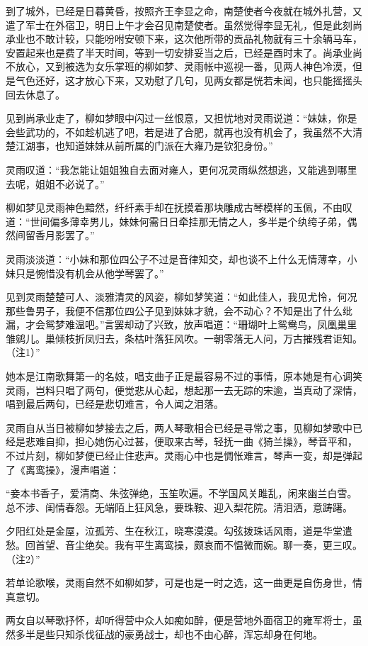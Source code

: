 到了城外，已经是日暮黄昏，按照齐王李显之命，南楚使者今夜就在城外扎营，又遣了军士在外宿卫，明日上午才会召见南楚使者。虽然觉得李显无礼，但是此刻尚承业也不敢计较，只能吩咐安顿下来，这次他所带的贡品礼物就有三十余辆马车，安置起来也是费了半天时间，等到一切安排妥当之后，已经是酉时末了。尚承业尚不放心，又到被选为女乐掌班的柳如梦、灵雨帐中巡视一番，见两人神色冷漠，但是气色还好，这才放心下来，又劝慰了几句，见两女都是恍若未闻，也只能摇摇头回去休息了。

见到尚承业走了，柳如梦眼中闪过一丝恨意，又担忧地对灵雨说道：“妹妹，你是会些武功的，不如趁机逃了吧，若是进了合肥，就再也没有机会了，我虽然不大清楚江湖事，也知道妹妹从前所属的门派在大雍乃是钦犯身份。”

灵雨叹道：“我怎能让姐姐独自去面对雍人，更何况灵雨纵然想逃，又能逃到哪里去呢，姐姐不必说了。”

柳如梦见灵雨神色黯然，纤纤素手却在抚摸着那块雕成古琴模样的玉佩，不由叹道：“世间偏多薄幸男儿，妹妹何需日日牵挂那无情之人，多半是个纨绔子弟，偶然间留香月影罢了。”

灵雨淡淡道：“小妹和那位四公子不过是音律知交，却也谈不上什么无情薄幸，小妹只是惋惜没有机会从他学琴罢了。”

见到灵雨楚楚可人、淡雅清灵的风姿，柳如梦笑道：“如此佳人，我见尤怜，何况那些鲁男子，我便不信那位四公子见到妹妹才貌，会不动心？不知是出了什么纰漏，才会鸳梦难温吧。”言罢却动了兴致，放声唱道：“珊瑚叶上鸳鸯鸟，凤凰巢里雏鹓儿。巢倾枝折凤归去，条枯叶落狂风吹。一朝零落无人问，万古摧残君讵知。（注1）”

她本是江南歌舞第一的名妓，唱支曲子正是最容易不过的事情，原本她是有心调笑灵雨，岂料只唱了两句，便觉悲从心起，想起那一去无踪的宋逾，当真动了深情，唱到最后两句，已经是悲切难言，令人闻之泪落。

灵雨自从当日被柳如梦接去之后，两人琴歌相合已经是寻常之事，见柳如梦歌中已经是悲难自抑，担心她伤心过甚，便取来古琴，轻抚一曲《猗兰操》，琴音平和，不过片刻，柳如梦便已经止住悲声。灵雨心中也是惆怅难言，琴声一变，却是弹起了《离鸾操》，漫声唱道：

“妾本书香子，爱清商、朱弦弹绝，玉笙吹遍。不学国风关雎乱，闲来幽兰白雪。总不涉、闺情春怨。无端陌上狂风急，要珠鞍、迎入梨花院。清泪洒，意踌躇。

夕阳红处是金屋，泣孤芳、生在秋江，晓寒漠漠。勾弦拨珠话风雨，道是华堂遣愁。回首望、音尘绝矣。我有平生离鸾操，颇哀而不愠微而婉。聊一奏，更三叹。（注2）”

若单论歌喉，灵雨自然不如柳如梦，可是也是一时之选，这一曲更是自伤身世，情真意切。

两女自以琴歌抒怀，却听得营中众人如痴如醉，便是营地外面宿卫的雍军将士，虽然多半是些只知杀伐征战的豪勇战士，却也不由心醉，浑忘却身在何地。

